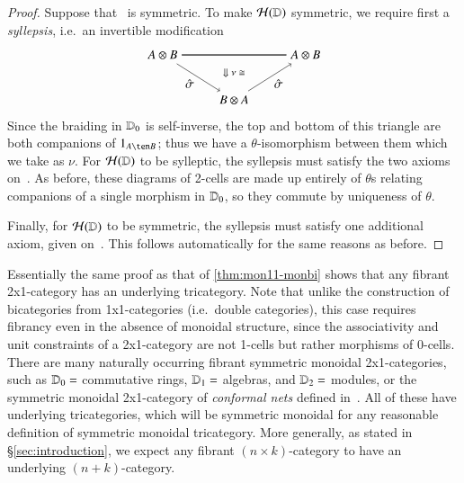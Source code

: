 \documentclass{amsart}
\begin{document}
\begin{proof}
Suppose that \lD\ is symmetric.  To make $\mathcal{H}(\mathbb{D})$ symmetric,
  we require first a \emph{syllepsis}, i.e.\ an invertible
  modification
  \[
 \begin{tikzpicture}
 \node (tl) at (-2,1) {$A \otimes B$};
 \node (tr) at (2,1) {$A \otimes B$};
 \node (b) at (0,-.25) {$B \otimes A$};
 \draw[double] (tl)  -- (tr);
 \draw[->] (tl) to node[left, yshift=-5pt]{$\hat{\sigma}$} (b);
 \draw[->] (b) to node[right, yshift=-5pt] {$\hat{\sigma}$}(tr);
 \node at (0,0.5) {\footnotesize $\Downarrow \nu\iso$}; 
 \end{tikzpicture}
 \]
  Since the braiding in $\mathbb{D}_0$ is self-inverse, the top and bottom of
  this triangle are both companions of $1_{A\ten B}$; thus we have a
  $\theta$-isomorphism between them which we take as $\nu$.  For
  $\mathcal{H}(\mathbb{D})$ to be sylleptic, the syllepsis must satisfy the two
  axioms on~\cite[p144--145]{mccrudden:bal-coalgb}.  As before, these
  diagrams of 2-cells are made up entirely of $\theta$s relating
  companions of a single morphism in $\mathbb{D}_0$, so they commute by
  uniqueness of $\theta$.



  Finally, for $\mathcal{H}(\mathbb{D})$ to be symmetric, the syllepsis must satisfy
  one additional axiom, given on~\cite[p91]{mccrudden:bal-coalgb}.
  This follows automatically for the same reasons as before.
\end{proof}




\begin{rmk}
  Essentially the same proof as that of \autoref{thm:mon11-monbi}
  shows that any fibrant 2x1-category has an underlying tricategory.
  Note that unlike the construction of bicategories from
  1x1-categories (i.e.\ double categories), this case requires
  fibrancy even in the absence of monoidal structure, since the
  associativity and unit constraints of a 2x1-category are not 1-cells
  but rather morphisms of 0-cells.  There are many naturally occurring
  fibrant symmetric monoidal 2x1-categories, such as $\mathbb{D}_0=$
  commutative rings, $\mathbb{D}_1=$ algebras, and $\mathbb{D}_2=$ modules, or the
  symmetric monoidal 2x1-category of \emph{conformal nets} defined
  in~\cite{bdh:confnets-i}.  All of these have underlying
  tricategories, which will be symmetric monoidal for any reasonable
  definition of symmetric monoidal tricategory.  More generally, as
  stated in \S\ref{sec:introduction}, we expect any fibrant $(n\times
  k)$-category to have an underlying $(n+k)$-category.
\end{rmk}
\end{document}
